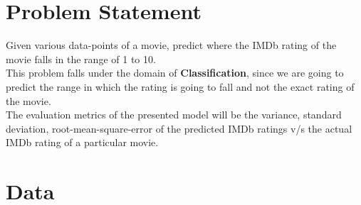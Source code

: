 \documentclass[conference]{IEEEtran}
\begin{document}
\section{Problem Statement}
Given various data-points of a movie, predict where the IMDb rating of the movie falls in the range of 1 to 10.\\
This problem falls under the domain of \textbf{Classification}, since we are going to predict the range in which the rating is going to fall and not the exact rating of the movie.\\
The evaluation metrics of the presented model will be the variance, standard deviation, root-mean-square-error of the predicted IMDb ratings v/s the actual IMDb rating of a particular movie.\\
\newpage
\section{Data}
\end{document}
